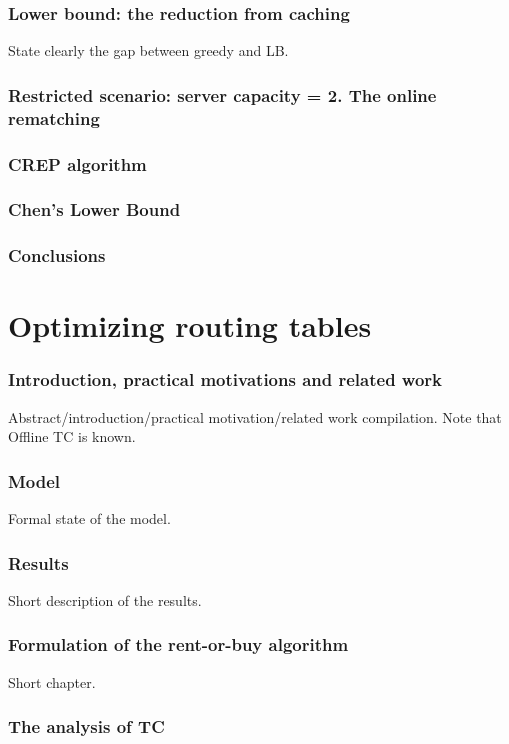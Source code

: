 \documentclass[a4paper]{article}
\begin{document}
\subsubsection{Lower bound: the reduction from caching}
State clearly the gap between greedy and LB. 
\subsubsection{Restricted scenario: server capacity = 2. The online rematching}
\subsubsection{CREP algorithm}
\subsubsection{Chen's Lower Bound}
\subsubsection{Conclusions}

\section{Optimizing routing tables}

\subsubsection{Introduction, practical motivations and related work}

Abstract/introduction/practical motivation/related work compilation.
Note that Offline TC is known.

\subsubsection{Model}
Formal state of the model.
\subsubsection{Results}
Short description of the results.
\subsubsection{Formulation of the rent-or-buy algorithm}
Short chapter.
\subsubsection{The analysis of TC}
\end{document}

